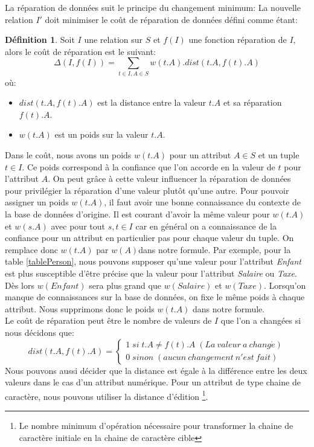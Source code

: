 \documentclass[letterpaper, 12pt]{report}
\theoremstyle{definition}
\newtheorem{mydef}{Définition}
\begin{document}
La réparation de données suit le principe du changement minimum: La nouvelle relation $I'$ doit minimiser le coût de réparation de données défini comme étant:

\begin{mydef}
\label{coutRéparation}
 Soit $I$ une relation sur $S$ et $f(I)$ une fonction réparation de $I$, alors le coût de réparation est le suivant:
 $$ \Delta(I,f(I)) = \sum_{t \in I, A \in S} w(t.A).dist(t.A,f(t).A) $$
 où:
 \begin{itemize}
 	\item $dist(t.A,f(t).A)$ est la distance entre la valeur $t.A$ et sa réparation $f(t).A$.
 	\item $w(t.A)$ est un poids sur la valeur $t.A$.
 \end{itemize}
\end{mydef}

Dans le coût, nous avons un poids $w(t.A)$ pour un attribut $A \in S$ et un tuple $t \in I$. Ce poids correspond à la confiance que l'on accorde en la valeur de $t$ pour l'attribut $A$. On peut grâce à cette valeur influencer la réparation de données pour privilégier la réparation d'une valeur plutôt qu'une autre. Pour pouvoir assigner un poids $w(t.A)$, il faut avoir une bonne connaissance du contexte de la base de données d'origine. Il est courant d'avoir la même valeur pour $w(t.A)$ et $w(s.A)$ avec pour tout $s,t \in I$ car en général on a connaissance de la confiance pour un attribut en particulier pas pour chaque valeur du tuple. On remplace donc $w(t.A)$ par $w(A)$dans notre formule. Par exemple, pour la table \ref{tablePerson}, nous pouvons supposer qu'une valeur pour l'attribut \emph{Enfant} est plus susceptible d'être précise que la valeur pour l'attribut \emph{Salaire} ou \emph{Taxe}. Dès lors $w(Enfant)$ sera plus grand que $w(Salaire)$ et $w(Taxe)$. Lorsqu'on manque de connaissances sur la base de données, on fixe le même poids à chaque attribut. Nous supprimons donc le poids $w(t.A)$ dans notre formule.\\

Le coût de réparation peut être le nombre de valeurs de $I$ que l'on a changées si nous décidons que:
$$
dist(t.A,f(t).A) =
\left\{
	\begin{array}{ll}
	  1 \; si\; t.A \neq f(t).A \;(La\ valeur\ a\ chang\acute{e}) \\
	  0 \; sinon\;(aucun\ changement\ n'est\ fait)
	\end{array}
\right.
$$
Nous pouvons aussi décider que la distance est égale à la différence entre les deux valeurs dans le cas d'un attribut numérique. Pour un attribut de type chaine de caractère, nous pouvons utiliser la distance d'édition \footnote{Le nombre minimum d'opération nécessaire pour transformer la chaine de caractère initiale en la chaine de caractère cible}.\\
\end{document}
